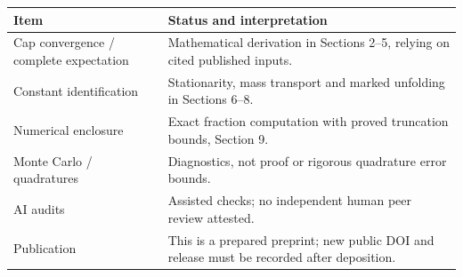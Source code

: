 \documentclass[11pt,a4paper]{article}
\theoremstyle{remark}\newtheorem{remark}{Remark}
\numberwithin{equation}{section}
\begin{document}
\begin{tabularx}{\textwidth}{@{}lX@{}}\toprule
Item & Status and interpretation\\\midrule
Cap convergence / complete expectation & Mathematical derivation in Sections 2--5, relying on cited published inputs.\\
Constant identification & Stationarity, mass transport and marked unfolding in Sections 6--8.\\
Numerical enclosure & Exact fraction computation with proved truncation bounds, Section 9.\\
Monte Carlo / quadratures & Diagnostics, not proof or rigorous quadrature error bounds.\\
AI audits & Assisted checks; no independent human peer review attested.\\
Publication & This is a prepared preprint; new public DOI and release must be recorded after deposition.\\\bottomrule
\end{tabularx}
\end{document}
